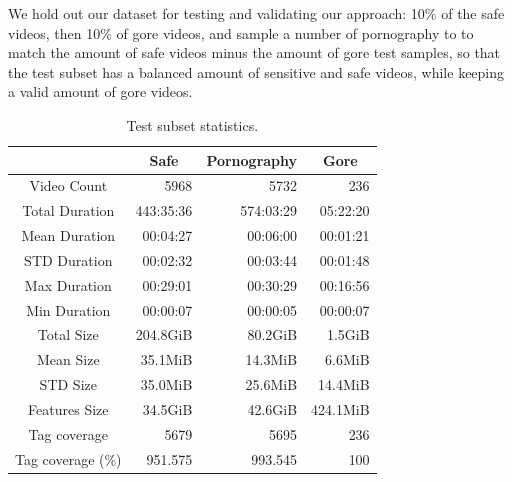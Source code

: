 We hold out our dataset for testing and validating our approach: 10\% of the safe videos, then 10\% of gore videos, and sample a number of pornography to to match the amount of safe videos minus the amount of gore test samples, so that the test subset has a balanced amount of sensitive and safe videos, while keeping a valid amount of gore videos. 

\begin{table}
\centering
\label{tab:subset-stats}
\caption{Test subset statistics.}
\begin{tabular}{c|r|r|r} 
\multicolumn{1}{l|}{} & \multicolumn{1}{c|}{Safe} & \multicolumn{1}{c|}{Pornography} & \multicolumn{1}{c}{Gore}  \\ 
\hline
Video Count           & 5968                      & 5732                             & 236                        \\ 
\hline
Total Duration        & 443:35:36                 & 574:03:29                        & 05:22:20                   \\ 
\hline
Mean Duration         & 00:04:27                  & 00:06:00                         & 00:01:21                   \\ 
\hline
STD Duration          & 00:02:32                  & 00:03:44                         & 00:01:48                   \\ 
\hline
Max Duration          & 00:29:01                  & 00:30:29                         & 00:16:56                   \\ 
\hline
Min Duration          & 00:00:07                  & 00:00:05                         & 00:00:07                   \\ 
\hline
Total Size            & 204.8GiB                  & 80.2GiB                          & 1.5GiB                     \\ 
\hline
Mean Size             & 35.1MiB                   & 14.3MiB                          & 6.6MiB                     \\ 
\hline
STD Size              & 35.0MiB                   & 25.6MiB                          & 14.4MiB                    \\ 
\hline
Features Size         & 34.5GiB                   & 42.6GiB                          & 424.1MiB                   \\ 
\hline
Tag coverage          & 5679                      & 5695                             & 236                        \\ 
\hline
Tag coverage (\%)     & 951.575                   & 993.545                          & 100                        \\
\end{tabular}
\end{table}


